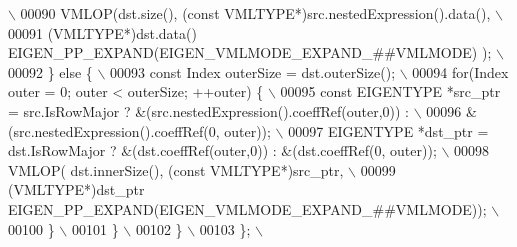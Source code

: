 \begin{DoxyCode}
{                           \(\backslash\)}
00090 \textcolor{preprocessor}{        VMLOP(dst.size(), (const VMLTYPE*)src.nestedExpression().data(),                                   
                           \(\backslash\)}
00091 \textcolor{preprocessor}{              (VMLTYPE*)dst.data() EIGEN\_PP\_EXPAND(EIGEN\_VMLMODE\_EXPAND\_##VMLMODE) );                      
                           \(\backslash\)}
00092 \textcolor{preprocessor}{      \} else \{                                                                                             
                           \(\backslash\)}
00093 \textcolor{preprocessor}{        const Index outerSize = dst.outerSize();                                                           
                           \(\backslash\)}
00094 \textcolor{preprocessor}{        for(Index outer = 0; outer < outerSize; ++outer) \{                                                 
                           \(\backslash\)}
00095 \textcolor{preprocessor}{          const EIGENTYPE *src\_ptr = src.IsRowMajor ? &(src.nestedExpression().coeffRef(outer,0)) :        
                           \(\backslash\)}
00096 \textcolor{preprocessor}{                                                      &(src.nestedExpression().coeffRef(0, outer));        
                           \(\backslash\)}
00097 \textcolor{preprocessor}{          EIGENTYPE *dst\_ptr = dst.IsRowMajor ? &(dst.coeffRef(outer,0)) : &(dst.coeffRef(0, outer));      
                           \(\backslash\)}
00098 \textcolor{preprocessor}{          VMLOP( dst.innerSize(), (const VMLTYPE*)src\_ptr,                                                 
                           \(\backslash\)}
00099 \textcolor{preprocessor}{                (VMLTYPE*)dst\_ptr EIGEN\_PP\_EXPAND(EIGEN\_VMLMODE\_EXPAND\_##VMLMODE));                        
                           \(\backslash\)}
00100 \textcolor{preprocessor}{        \}                                                                                                  
                           \(\backslash\)}
00101 \textcolor{preprocessor}{      \}                                                                                                    
                           \(\backslash\)}
00102 \textcolor{preprocessor}{    \}                                                                                                      
                           \(\backslash\)}
00103 \textcolor{preprocessor}{  \};                                                                                                       
                           \(\backslash\)}

\end{DoxyCode}
